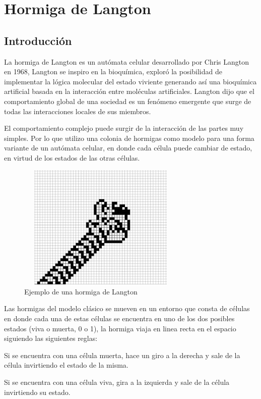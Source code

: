 \section{Hormiga de Langton}
\subsection{Introducción}
La hormiga de Langton es un autómata celular desarrollado por Chris Langton en 1968, Langton se inspiro en la bioquímica, exploró la posibilidad de implementar la lógica molecular del estado viviente generando así una bioquímica artificial basada en la interacción entre moléculas artificiales. Langton dijo que el comportamiento global de una sociedad es un fenómeno emergente que surge de todas las interacciones locales de sus miembros. 

El comportamiento complejo puede surgir de la interacción de las partes muy simples. Por lo que utilizo una colonia de hormigas como modelo para una forma variante de un autómata celular, en donde cada célula puede cambiar de estado, en virtud de los estados de las otras células. \cite{LANGTON}

\begin{figure}[H]
\begin{center}
 \includegraphics[width=8cm, height=6cm]{img/ant.jpg}
 \caption{Ejemplo de una hormiga de Langton}
 \label{fig:ant}
\end{center}
\end{figure}

Las hormigas del modelo clásico se mueven en un entorno que consta de células en donde cada una de estas células se encuentra en uno de los dos posibles estados (viva o muerta, 0 o 1), la hormiga viaja en linea recta en el espacio siguiendo las siguientes reglas:
\begin{description}
 \item Si se encuentra con una célula muerta, hace un giro a la derecha y sale de la célula invirtiendo el estado de la misma.
 \item Si se encuentra con una célula viva, gira a la izquierda y sale de la célula invirtiendo su estado.
\end{description}

